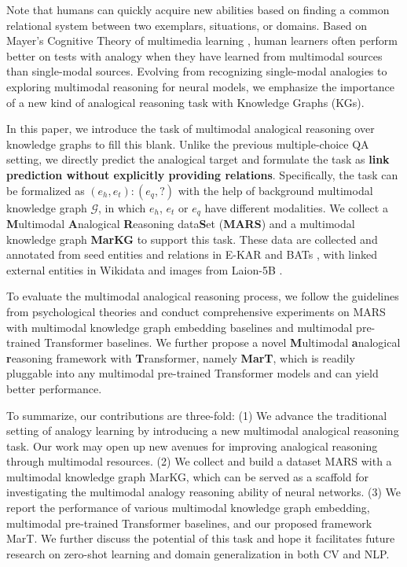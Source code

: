 \documentclass{article} \usepackage{iclr2023_conference,times}
\newcommand{\ours}{MarT}
\newcommand{\data}{MARS}
\newcommand{\kg}{MarKG}
\begin{document}
Note that humans can quickly acquire new abilities based on finding a common relational system between two exemplars, situations, or domains.
Based on Mayer's Cognitive Theory of multimedia learning \citep{hegarty1993constructing,mayer2002multimedia}, human learners often perform better on tests with analogy when they have learned from multimodal sources than single-modal sources. 
Evolving from recognizing single-modal analogies to exploring multimodal reasoning for neural models, we emphasize the importance of a new kind of analogical reasoning task with Knowledge Graphs (KGs).


In this paper, we introduce the task of multimodal analogical reasoning over knowledge graphs to fill this blank.
Unlike the previous multiple-choice QA setting, we directly predict the analogical target and formulate the task as \textbf{link prediction without explicitly providing relations}.
Specifically, the task can be formalized as $(e_h, e_t):(e_q,?)$ with the help of background multimodal knowledge graph $\mathcal{G}$, in which $e_h$, $e_t$ or $e_q$ have different modalities.
We collect a \textbf{M}ultimodal \textbf{A}nalogical \textbf{R}easoning data\textbf{S}et (\textbf{{\data}}) and a multimodal knowledge graph \textbf{{\kg}} to support this task. 
These data are collected and annotated from seed entities and relations in E-KAR \citep{E-KAR} and BATs \citep{BATs}, with linked external entities in Wikidata and images from  Laion-5B \citep{Laion400M}.

To evaluate the multimodal analogical reasoning process, we follow the guidelines from psychological theories and conduct comprehensive experiments on {\data} with multimodal knowledge graph embedding baselines and multimodal pre-trained Transformer baselines.
We further propose a novel \textbf{M}ultimodal \textbf{a}nalogical \textbf{r}easoning framework with \textbf{T}ransformer, namely {\textbf{\ours}}, which is readily pluggable into any multimodal pre-trained Transformer models and can yield better performance.


To summarize, our contributions are three-fold:
(1) We advance the traditional setting of analogy learning by introducing a new multimodal analogical reasoning task.
Our work may open up new avenues for improving analogical reasoning through multimodal resources.
(2) We collect and build a dataset {\data} with a multimodal knowledge graph \kg, which can be served as a scaffold for investigating the multimodal analogy reasoning ability of neural networks.
(3) We report the performance of various multimodal knowledge graph embedding, multimodal pre-trained Transformer baselines, and our proposed framework {\ours}.
We further discuss the potential of this task and hope it facilitates future research on zero-shot learning and domain generalization in both CV and NLP.
\end{document}
